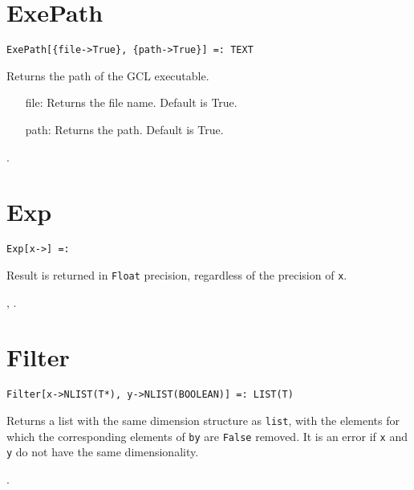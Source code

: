 
\section*{ExePath}\label{PrimExePath}
\begin{verbatim}
ExePath[{file->True}, {path->True}] =: TEXT 
\end{verbatim}

\noindent
Returns the path of the GCL executable. 
\begin{itemize}
\item [file:] Returns the file name.  Default is True.  
\item [path:] Returns the path.  Default is True. 
\end{itemize}

\seealso {}.


\section*{Exp}\label{PrimExp}
\texttt{Exp[x->] =: } 


\note Result is returned in \verb+Float+ precision, regardless
of the precision of \verb+x+.

\seealso {}, .


\section*{Filter}\label{PrimFilter}
\begin{verbatim}
Filter[x->NLIST(T*), y->NLIST(BOOLEAN)] =: LIST(T)
\end{verbatim}
\foralltypes

\noindent
Returns a list with the same dimension structure as \verb+list+, with the
elements for which the corresponding elements of \verb+by+ are \verb+False+
removed.  It is an error if \verb+x+ and \verb+y+ do not have the same
dimensionality.

\seealso {}.


